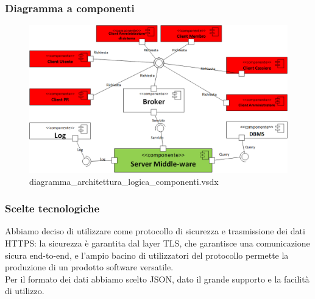 \documentclass[a4paper]{article}
\begin{document}





\subsubsection{Diagramma a componenti}

\begin{figure}[H]
    \includegraphics[scale=0.55]{Progettazione/diagramma_architettura_logica_componenti.png}
    \centering
    \caption{diagramma\_architettura\_logica\_componenti.vsdx}
\end{figure}

\subsubsection{Scelte tecnologiche}
Abbiamo deciso di utilizzare come protocollo di sicurezza e trasmissione dei dati HTTPS: la sicurezza è garantita dal layer TLS, che garantisce una comunicazione sicura end-to-end, e l'ampio bacino di utilizzatori del protocollo permette la produzione di un prodotto software versatile.\\Per il formato dei dati abbiamo scelto JSON, dato il grande supporto e la facilità di utilizzo.
\end{document}

